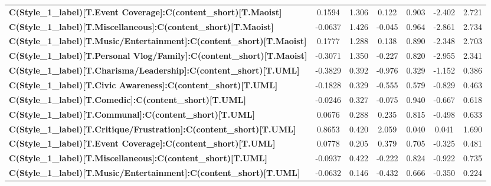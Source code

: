 \begin{center}
\begin{tabular}{lcccccc}
\textbf{C(Style\_1\_label)[T.Event Coverage]:C(content\_short)[T.Maoist]}            &       0.1594  &        1.306     &     0.122  &         0.903        &       -2.402    &        2.721     \\
\textbf{C(Style\_1\_label)[T.Miscellaneous]:C(content\_short)[T.Maoist]}             &      -0.0637  &        1.426     &    -0.045  &         0.964        &       -2.861    &        2.734     \\
\textbf{C(Style\_1\_label)[T.Music/Entertainment]:C(content\_short)[T.Maoist]}       &       0.1777  &        1.288     &     0.138  &         0.890        &       -2.348    &        2.703     \\
\textbf{C(Style\_1\_label)[T.Personal Vlog/Family]:C(content\_short)[T.Maoist]}      &      -0.3071  &        1.350     &    -0.227  &         0.820        &       -2.955    &        2.341     \\
\textbf{C(Style\_1\_label)[T.Charisma/Leadership]:C(content\_short)[T.UML]}          &      -0.3829  &        0.392     &    -0.976  &         0.329        &       -1.152    &        0.386     \\
\textbf{C(Style\_1\_label)[T.Civic Awareness]:C(content\_short)[T.UML]}              &      -0.1828  &        0.329     &    -0.555  &         0.579        &       -0.829    &        0.463     \\
\textbf{C(Style\_1\_label)[T.Comedic]:C(content\_short)[T.UML]}                      &      -0.0246  &        0.327     &    -0.075  &         0.940        &       -0.667    &        0.618     \\
\textbf{C(Style\_1\_label)[T.Communal]:C(content\_short)[T.UML]}                     &       0.0676  &        0.288     &     0.235  &         0.815        &       -0.498    &        0.633     \\
\textbf{C(Style\_1\_label)[T.Critique/Frustration]:C(content\_short)[T.UML]}         &       0.8653  &        0.420     &     2.059  &         0.040        &        0.041    &        1.690     \\
\textbf{C(Style\_1\_label)[T.Event Coverage]:C(content\_short)[T.UML]}               &       0.0778  &        0.205     &     0.379  &         0.705        &       -0.325    &        0.481     \\
\textbf{C(Style\_1\_label)[T.Miscellaneous]:C(content\_short)[T.UML]}                &      -0.0937  &        0.422     &    -0.222  &         0.824        &       -0.922    &        0.735     \\
\textbf{C(Style\_1\_label)[T.Music/Entertainment]:C(content\_short)[T.UML]}          &      -0.0632  &        0.146     &    -0.432  &         0.666        &       -0.350    &        0.224     \\

\end{tabular}
\end{center}
